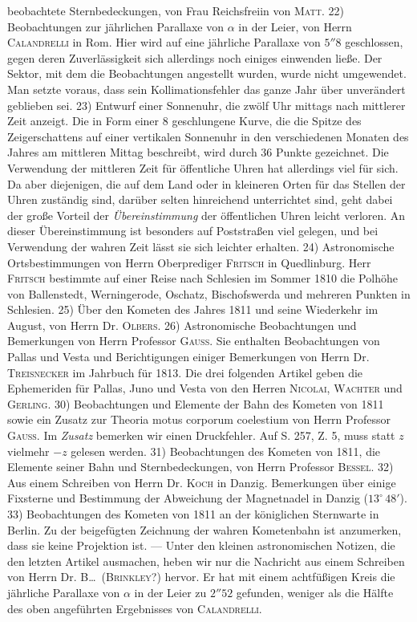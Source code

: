 beobachtete Sternbedeckungen, von Frau Reichsfreiin von \textsc{Matt}. 22) Beobachtungen zur jährlichen Parallaxe von $\alpha$ in der Leier, von Herrn \textsc{Calandrelli} in Rom. Hier wird auf eine jährliche Parallaxe von $5''8$ geschlossen, gegen deren Zuverlässigkeit sich allerdings noch einiges einwenden ließe. Der Sektor, mit dem die Beobachtungen angestellt wurden, wurde nicht umgewendet. Man setzte voraus, dass sein Kollimationsfehler das ganze Jahr über unverändert geblieben sei. 23) Entwurf einer Sonnenuhr, die zwölf Uhr mittags nach mittlerer Zeit anzeigt. Die in Form einer 8 geschlungene Kurve, die die Spitze des Zeigerschattens auf einer vertikalen Sonnenuhr in den verschiedenen Monaten des Jahres am mittleren Mittag beschreibt, wird durch 36 Punkte gezeichnet. Die Verwendung der mittleren Zeit für öffentliche Uhren hat allerdings viel für sich. Da aber diejenigen, die auf dem Land oder in kleineren Orten für das Stellen der Uhren zuständig sind, darüber selten hinreichend unterrichtet sind, geht dabei der große Vorteil der \emph{Übereinstimmung} der öffentlichen Uhren leicht verloren. An dieser Übereinstimmung ist besonders auf Poststraßen viel gelegen, und bei Verwendung der wahren Zeit lässt sie sich leichter erhalten. 24) Astronomische Ortsbestimmungen von Herrn Oberprediger \textsc{Fritsch} in Quedlinburg. Herr \textsc{Fritsch} bestimmte auf einer Reise nach Schlesien im Sommer 1810 die Polhöhe von Ballenstedt, Werningerode, Oschatz, Bischofswerda und mehreren Punkten in Schlesien. 25) Über den Kometen des Jahres 1811 und seine Wiederkehr im August, von Herrn Dr. \textsc{Olbers}. 26) Astronomische Beobachtungen und Bemerkungen von Herrn Professor \textsc{Gauss}. Sie enthalten Beobachtungen von Pallas und Vesta und Berichtigungen einiger Bemerkungen von Herrn Dr. \textsc{Treisnecker} im Jahrbuch für 1813. Die drei folgenden Artikel geben die Ephemeriden für Pallas, Juno und Vesta von den Herren \textsc{Nicolai}, \textsc{Wachter} und \textsc{Gerling}. 30) Beobachtungen und Elemente der Bahn des Kometen von 1811 sowie ein Zusatz zur Theoria motus corporum coelestium von Herrn Professor \textsc{Gauss}. Im \emph{Zusatz} bemerken wir einen Druckfehler. Auf S. 257, Z. 5, muss statt $z$ vielmehr $-z$ gelesen werden. 31) Beobachtungen des Kometen von 1811, die Elemente seiner Bahn und Sternbedeckungen, von Herrn Professor \textsc{Bessel}. 32) Aus einem Schreiben von Herrn Dr. \textsc{Koch} in Danzig. Bemerkungen über einige Fixsterne und Bestimmung der Abweichung der Magnetnadel in Danzig ($13^\circ\,48'$). 33) Beobachtungen des Kometen von 1811 an der königlichen Sternwarte in Berlin. Zu der beigefügten Zeichnung der wahren Kometenbahn ist anzumerken, dass sie keine Projektion ist. --- Unter den kleinen astronomischen Notizen, die den letzten Artikel ausmachen, heben wir nur die Nachricht aus einem Schreiben von Herrn Dr. B\dots\ (\textsc{Brinkley}?) hervor. Er hat mit einem achtfüßigen Kreis die jährliche Parallaxe von $\alpha$ in der Leier zu $2''52$ gefunden, weniger als die Hälfte des oben angeführten Ergebnisses von \textsc{Calandrelli}.

